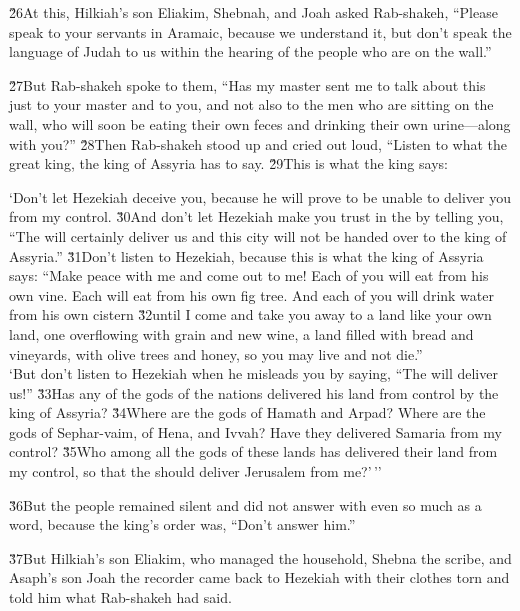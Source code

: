 \v{26}At this, Hilkiah's son Eliakim, Shebnah, and Joah asked Rab-shakeh, ``Please speak to your servants in Aramaic, because we understand it, but don't speak the language of Judah to us within the hearing of the people who are on the wall.''

\v{27}But Rab-shakeh spoke to them, ``Has my master sent me to talk about this just to your master and to you, and not also to the men who are sitting on the wall, who will soon be eating their own feces and drinking their own urine---along with you?'' \v{28}Then Rab-shakeh stood up and cried out loud, ``Listen to what the great king, the king of Assyria has to say. \v{29}This is what the king says:

\begin{poetry}
\poeml `Don't let Hezekiah deceive you, because he will prove to be unable to deliver you from my control. \v{30}And don't let Hezekiah make you trust in the  by telling you, ``The  will certainly deliver us and this city will not be handed over to the king of Assyria.'' \v{31}Don't listen to Hezekiah, because this is what the king of Assyria says: ``Make peace with me and come out to me! Each of you will eat from his own vine. Each will eat from his own fig tree. And each of you will drink water from his own cistern \v{32}until I come and take you away to a land like your own land, one overflowing with grain and new wine, a land filled with bread and vineyards, with olive trees and honey, so you may live and not die.'' \\
\poeml `But don't listen to Hezekiah when he misleads you by saying, ``The  will deliver us!'' \v{33}Has any of the gods of the nations delivered his land from control by the king of Assyria? \v{34}Where are the gods of Hamath and Arpad? Where are the gods of Sephar-vaim, of Hena, and Ivvah? Have they delivered Samaria from my control? \v{35}Who among all the gods of these lands has delivered their land from my control, so that the  should deliver Jerusalem from me?'\,''
\end{poetry}

\v{36}But the people remained silent and did not answer with even so much as a word, because the king's order was, ``Don't answer him.''

\v{37}But Hilkiah's son Eliakim, who managed the household, Shebna the scribe, and Asaph's son Joah the recorder came back to Hezekiah with their clothes torn and told him what Rab-shakeh had said.

